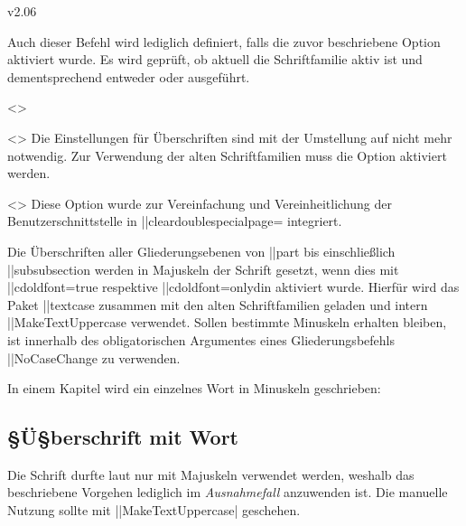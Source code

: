\begin{Changes}{v2.06}
\begin{Obsolete}
  {}
\printdeclarationlist
%
Auch dieser Befehl wird lediglich definiert, falls die zuvor beschriebene 
Option  aktiviert wurde. Es wird geprüft, ob aktuell die 
Schriftfamilie \DIN aktiv ist und dementsprechend entweder  
oder  ausgeführt. 
\end{Obsolete}

\begin{Obsolete}
  {}
  <>
\begin{Obsolete}
  {}
  <>
\printdeclarationlist
%
Die Einstellungen für Überschriften sind mit der Umstellung auf \OpenSans nicht 
mehr notwendig. Zur Verwendung der alten Schriftfamilien muss die Option 
 aktiviert werden.
\end{Obsolete}
\end{Obsolete}

\begin{Obsolete}
  {}
  <>
\printdeclarationlist
%
Diese Option wurde zur Vereinfachung und Vereinheitlichung der 
Benutzerschnittstelle in \Option||{cleardoublespecialpage=\PMisc} integriert.
\end{Obsolete}



%
Die Überschriften aller Gliederungsebenen von \Macro||{part} bis einschließlich 
\Macro||{subsubsection} werden in Majuskeln der Schrift \DIN gesetzt, wenn dies 
mit \Option||{cdoldfont=true} respektive \Option||{cdoldfont=onlydin} aktiviert 
wurde. Hierfür wird das Paket \Package||{textcase} zusammen mit den alten 
Schriftfamilien geladen und intern \Macro||{MakeTextUppercase} verwendet. 
Sollen bestimmte Minuskeln erhalten bleiben, ist innerhalb des obligatorischen 
Argumentes eines Gliederungsbefehls \Macro||{NoCaseChange} zu verwenden.
%
\begin{Example}
In einem Kapitel wird ein einzelnes Wort in Minuskeln geschrieben:
\begin{Code}[escapechar=§]
\chapter{§Ü§berschrift mit  Wort}
\end{Code}
\end{Example}
%
Die Schrift \DIN durfte laut \CD nur mit Majuskeln verwendet werden, weshalb 
das beschriebene Vorgehen lediglich im \emph{Ausnahmefall} anzuwenden ist. 
Die manuelle Nutzung sollte mit 
\Macro||{MakeTextUppercase|} 
geschehen.%
\end{Changes}

